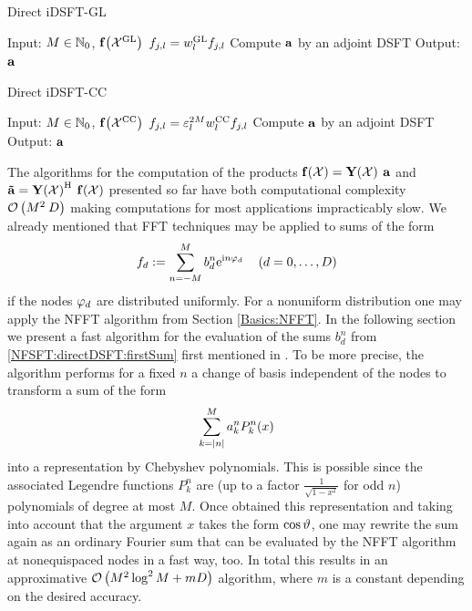 \begin{algorithm}[htb]
  \caption{Direct iDSFT-GL}
  \label{NFSFT:directIDSFTGL}    
  \begin{algorithmic}
    \STATE Input: $M \in \mathbb{N}_{0}$, $\mathbf{f}{\hspace{-0.4ex}}\left(\mathcal{X}^{\mbox{\scriptsize\rm{GL}}}\right)$
    \STATE
        \STATE $f_{j,l} = w^{\mbox{\scriptsize\rm{GL}}}_{l} f_{j,l}$ 
      \ENDFOR
    \ENDFOR
    \STATE Compute $\mathbf{a}$ by an adjoint DSFT
    \STATE
    \STATE Output: $\mathbf{a}$
  \end{algorithmic}
\end{algorithm}
\begin{algorithm}[htb]
  \caption{Direct iDSFT-CC}
  \label{NFSFT:directIDSFTCC}    
  \begin{algorithmic}
    \STATE Input: $M \in \mathbb{N}_{0}$, $\mathbf{f}{\hspace{-0.4ex}}\left(\mathcal{X}^{\mbox{\scriptsize\rm{CC}}}\right)$
    \STATE
        \STATE $f_{j,l} = \varepsilon_{l}^{2M} w^{\mbox{\scriptsize\rm{CC}}}_{l} f_{j,l}$ 
      \ENDFOR
    \ENDFOR
    \STATE Compute $\mathbf{a}$ by an adjoint DSFT
    \STATE
    \STATE Output: $\mathbf{a}$
  \end{algorithmic}
\end{algorithm}

The algorithms for the computation of the products $\mathbf{f}{\hspace{-0.4ex}}\left(\mathcal{X}\right) = \mathbf{Y}{\hspace{-0.4ex}}\left(\mathcal{X}\right) \: \mathbf{a}$ and $\mathbf{\tilde{a}} = \mathbf{Y}{\hspace{-0.4ex}}\left(\mathcal{X}\right)^{\text{\rm{H}}} \: \mathbf{f}{\hspace{-0.4ex}}\left(\mathcal{X}\right)$ presented so far have both computational complexity $\mathcal{O}\left(M^2\:D\right)$ making computations for most applications impracticably slow. We already mentioned that FFT techniques may be applied to sums of the form
$$
  f_{d} := \sum_{n = -M}^M b^n_d \mbox{\rm{e}}^{\mbox{\scriptsize\rm{i}} n \varphi_{d}} \quad \left(d = 0,\ldots,D\right)
$$
if the nodes $\varphi_d$ are distributed uniformly. For a nonuniform distribution one may apply the NFFT algorithm from Section \ref{Basics:NFFT}. In the following section we present a fast algorithm for the evaluation of the sums $b^{n}_{d}$ from \eqref{NFSFT:directDSFT:firstSum} first mentioned in \cite{postta97}. To be more precise, the algorithm performs for a fixed $n$ a change of basis independent of the nodes to transform a sum of the form
\begin{equation}
  \label{NFSFT:LegendreSum}
  \sum_{k=\left\vert n\right\vert}^M a_{k}^n P_{k}^n{\hspace{-0.4ex}}\left(x\right)
\end{equation}
into a representation by Chebyshev polynomials. This is possible since the associated Legendre functions $P_{k}^n$ are (up to a factor $\frac{1}{\sqrt{1-x^2}}$ for odd $n$) polynomials of degree at most $M$. Once obtained this representation and taking into account that the argument $x$ takes the form $\cos \vartheta$, one may rewrite the sum again as an ordinary Fourier sum that can be evaluated by the NFFT algorithm at nonequispaced nodes in a fast way, too. In total this results in an approximative $\mathcal{O}\left(M^2 \log^2 M + mD\right)$ algorithm, where $m$ is a constant depending on the desired accuracy. 

